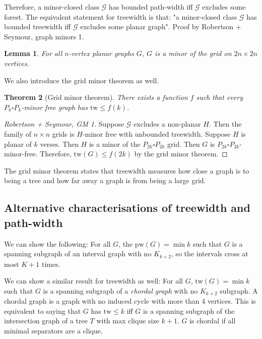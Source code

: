 \documentclass[]{article}
\newcommand{\tw}{\text{tw}}
\newcommand{\pw}{\text{pw}}
\newtheorem{theorem}{Theorem}
\newtheorem{lemma}[theorem]{Lemma}
\theoremstyle{definition}
\numberwithin{theorem}{section}
\numberwithin{equation}{section}
\begin{document}
Therefore, a minor-closed class $\mathcal{G}$ has bounded path-width iff $\mathcal{G}$ excludes some forest. The equivalent statement for treewidth is that: 
"a minor-closed class $\mathcal{G}$ has bounded treewidth iff $\mathcal{G}$ excludes some planar graph". Proof by Robertson + Seymour, graph minors 1.
\begin{lemma}
	For all $n$-vertex planar graphs $G$, $G$ is a minor of the grid on $2n \times 2n$ vertices.
\end{lemma}
We also introduce the grid minor theorem as well.
\begin{theorem}[Grid minor theorem]
	There exists a function $f$ such that every $P_k \square P_k$-minor free graph has $\tw \leq f(k)$. 
\end{theorem}
\begin{proof}[Robertson + Seymour, GM 1]
	Suppose $\mathcal{G}$ excludes a non-planar $H$. Then the family of $n \times n$ grids is $H$-minor free with unbounded treewidth.
	Suppose $H$ is planar of $k$ verses. Then $H$ is a minor of the $P_{2k} \square P_{2k}$ grid. Then $G$ is $P_{2k} \square P_{2k}$-minor-free. Therefore, $\tw(G) \leq f(2k)$ by the grid minor theorem. 
\end{proof}

The grid minor theorem states that treewidth measures how close a graph is to being a tree and how far away a graph is from being a large grid. 
\subsection{Alternative characterisations of treewidth and path-width}
We can show the following:
For all $G$, the $\pw(G) = \min k$ such that $G$ is a spanning subgraph of an interval graph with no $K_{k + 2}$, so the intervals cross at most $K + 1$ times. 

We can show a similar result for treewidth as well:
For all $G$, $\tw(G) = \min k$ such that $G$ is a spanning subgraph of a \textit{chordal graph} with no $K_{k + 2}$ subgraph. A chordal graph is a graph with no induced cycle with more than 4 vertices. This is equivalent to saying that $G$ has $\tw \leq k$ iff $G$ is a spanning subgraph of the intersection graph of a tree $T$ with max clique size $k + 1$. 
$G$ is chordal if all minimal separators are a clique. 
\end{document}
